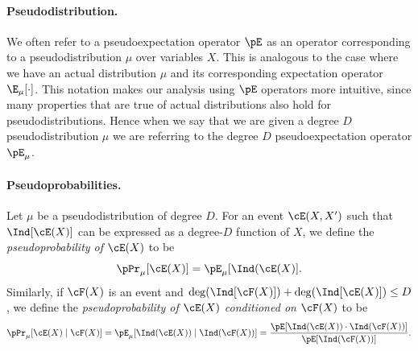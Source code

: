 \paragraph{Pseudodistribution.} 
We often refer to a pseudoexpectation operator $\pE$ as an operator corresponding to a pseudodistribution $\mu$ over variables $X$. This is analogous to the case where we have an actual distribution $\mu$ and its corresponding expectation operator $\E_\mu[\cdot]$. This notation makes our analysis using $\pE$ operators more intuitive, since many properties that are true of actual distributions also hold for pseudodistributions. Hence when we say that we are given a degree $D$ pseudodistribution $\mu$ we are referring to the degree $D$ pseudoexpectation operator $\pE_\mu$.



\paragraph{Pseudoprobabilities.}
\begin{definition}\label{def:pseudoprob}
Let $\mu$ be a pseudodistribution of degree $D$.
For an event $\cE(X,X')$ such that $\Ind[\cE(X)]$ can be expressed as a degree-$D$ function of $X$, we define the {\em pseudoprobability of $\cE(X)$} to be
\[
\pPr_{\mu}[\cE(X)] = \pE_{\mu}[\Ind(\cE(X)].
\]
Similarly, if $\cF(X)$ is an event and $\deg(\Ind[\cF(X)]) + \deg(\Ind[\cE(X)]) \le D$,  we define the {\em pseudoprobability of $\cE(X)$ conditioned on $\cF(X)$} to be
\[
\pPr_\mu[\cE(X) \mid \cF(X)] = \pE_\mu[\Ind(\cE(X)) \mid \Ind(\cF(X))] = \frac{\pE[\Ind(\cE(X)) \cdot \Ind(\cF(X))]}{\pE[\Ind(\cF(X))]}.
\]
\end{definition}


